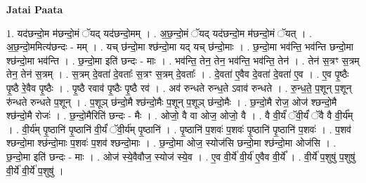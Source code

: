 \documentclass[17pt]{extarticle}
\begin{document}
\textbf{Jatai Paata} \newline

1. यद॑छन्दो॒म म॑छन्दो॒मं ॅयद् यद॑छन्दो॒मम् । . अ॒छ॒न्दो॒मं ॅयद् यद॑छन्दो॒म म॑छन्दो॒मं ॅयत् । . अ॒छ॒न्दो॒ममित्य॑छन्दः - मम् । . यच् छ॑न्दो॒मा श्छ॑न्दो॒मा यद् यच् छ॑न्दो॒माः । . छ॒न्दो॒मा भव॑न्ति॒ भव॑न्ति छन्दो॒मा श्छ॑न्दो॒मा भव॑न्ति । . छ॒न्दो॒मा इति॑ छन्दः - माः । . भव॑न्ति॒ तेन॒ तेन॒ भव॑न्ति॒ भव॑न्ति॒ तेन॑ । . तेन॑ स॒त्रꣳ स॒त्रम् तेन॒ तेन॑ स॒त्रम् । . स॒त्रम् दे॒वता॑ दे॒वताः᳚ स॒त्रꣳ स॒त्रम् दे॒वताः᳚ । . दे॒वता॑ ए॒वैव दे॒वता॑ दे॒वता॑ ए॒व । . ए॒व पृ॒ष्ठैः पृ॒ष्ठै रे॒वैव पृ॒ष्ठैः । . पृ॒ष्ठै रवाव॑ पृ॒ष्ठैः पृ॒ष्ठै रव॑ । . अव॑ रुन्धते रुन्ध॒ते ऽवाव॑ रुन्धते । . रु॒न्ध॒ते॒ प॒शून् प॒शून् रु॑न्धते रुन्धते प॒शून् । . प॒शूञ् छ॑न्दो॒मै श्छ॑न्दो॒मैः प॒शून् प॒शूञ् छ॑न्दो॒मैः । . छ॒न्दो॒मै रोज॒ ओज॑ श्छन्दो॒मै श्छ॑न्दो॒मै रोजः॑ । . छ॒न्दो॒मैरिति॑ छन्दः - मैः । . ओजो॒ वै वा ओज॒ ओजो॒ वै । . वै वी॒र्यं॑ ॅवी॒र्यं॑ ॅवै वै वी॒र्य᳚म् । . वी॒र्य॑म् पृ॒ष्ठानि॑ पृ॒ष्ठानि॑ वी॒र्यं॑ ॅवी॒र्य॑म् पृ॒ष्ठानि॑ । . पृ॒ष्ठानि॑ प॒शवः॑ प॒शवः॑ पृ॒ष्ठानि॑ पृ॒ष्ठानि॑ प॒शवः॑ । . प॒शव॑ श्छन्दो॒मा श्छ॑न्दो॒माः प॒शवः॑ प॒शव॑ श्छन्दो॒माः । . छ॒न्दो॒मा ओज॒ स्योज॑सि छन्दो॒मा श्छ॑न्दो॒मा ओज॑सि । . छ॒न्दो॒मा इति॑ छन्दः - माः । . ओज॑ स्ये॒वैवौज॒ स्योज॑ स्ये॒व । . ए॒व वी॒र्ये॑ वी॒र्य॑ ए॒वैव वी॒र्ये᳚ । . वी॒र्ये॑ प॒शुषु॑ प॒शुषु॑ वी॒र्ये॑ वी॒र्ये॑ प॒शुषु॑ । \newline
\end{document}
